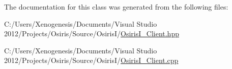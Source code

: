 The documentation for this class was generated from the following files\-:\begin{DoxyCompactItemize}
\item 
C\-:/\-Users/\-Xenogenesis/\-Documents/\-Visual Studio 2012/\-Projects/\-Osiris/\-Source/\-Osiris\-I/\hyperlink{_osiris_i___client_8hpp}{Osiris\-I\-\_\-\-Client.\-hpp}\item 
C\-:/\-Users/\-Xenogenesis/\-Documents/\-Visual Studio 2012/\-Projects/\-Osiris/\-Source/\-Osiris\-I/\hyperlink{_osiris_i___client_8cpp}{Osiris\-I\-\_\-\-Client.\-cpp}\end{DoxyCompactItemize}
